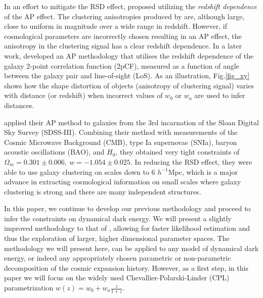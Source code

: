 \documentclass{natureprintstyle}
\let\citep\cite
\begin{document}
In an effort to mitigate the RSD effect, \cite{Li2014} proposed utilizing the {\it redshift dependence} of the AP effect. 
The clustering anisotropies produced by are, although large, close to uniform in magnitude over a wide range in redshift. 
However, if cosmological parameters are incorrectly chosen resulting in an AP effect, 
the anisotropy in the clustering signal has a clear redshift dependence. 
In a later work, \cite{Li2015} developed an AP methodology 
that utilises the redshift dependence of the galaxy 2-point correlation function (2pCF), 
measured as a function of angle between the galaxy pair and line-of-sight (LoS).
As an illustration, Fig.\ref{fig_xy} shows how the shape distortion of objects (anisotropy of clustering signal) varies with distance (or redshift) when incorrect values of  $w_0$ or $w_a$ are used to infer distances.

\citep{Li2016} applied their AP method to galaxies from the 3rd incarnation of the Sloan Digital Sky Survey (SDSS-III).
Combining their method with measurements of the Cosmic Microwave Background (CMB), type Ia supernovae (SNIa), 
baryon acoustic oscillations (BAO), and $H_0$,
they obtained very tight constraints of $ \Omega_m = 0.301 \pm 0.006,\ w=-1.054 \pm 0.025$.
In reducing the RSD effect, 
they were able to use galaxy clustering on scales down to 6 $h^{-1}$Mpc,
which is a major advance in extracting cosmological information 
on small scales where galaxy clustering is strong and there are many independent structures.

In this paper, we continue to develop our previous methodology and proceed to infer the constraints on dynamical dark energy. 
We will present a slightly improved methodology to that of \citep{Li2016}, 
allowing for faster likelihood estimation and thus the exploration of larger, higher dimensional parameter spaces. 
The methodology we will present here, can be applied to any model of dynamical dark energy, 
or indeed any appropriately chosen parametric or non-parametric decomposition of the cosmic expansion history. 
However, as a first step, in this paper we will focus on the widely used Chevallier-Polarski-Linder (CPL) parametrization
$w(z) = w_0 + w_a \frac{z}{1+z}$.
\end{document}
